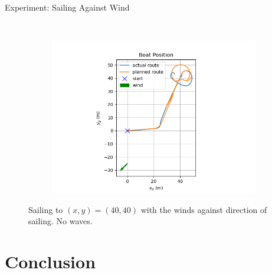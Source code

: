 \documentclass[10pt,xcolor={table,dvipsnames},t]{beamer}
\begin{document}
\begin{frame}{Experiment: Sailing Against Wind}
\begin{figure}
\begin{subfigure}[b]{0.33\textwidth}
         \label{fig:right_wind_speed}
     \end{subfigure}
     \hfill\\
     \begin{subfigure}[b]{0.4\textwidth}
         \centering
         \includegraphics[width=\textwidth,trim={0.5cm 0.0cm 1.25cm 0.5cm },clip]{documents/final_pres_figs/against_wind_to_40_40_pos.png}
         \label{fig:right_wind_pos}
     \end{subfigure}
    \caption{Sailing to \((x,y)=(40,40)\) with the winds against direction of sailing. No waves.}
    \label{fig:sail_against_wind}
\end{figure}
\end{frame}

    

    




\section{Conclusion}
\end{document}
